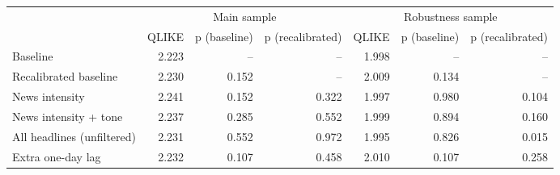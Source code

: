 \begin{tabular}{lrrrrrr}
\toprule
 & \multicolumn{3}{c}{Main sample} & \multicolumn{3}{c}{Robustness sample} \\
 & QLIKE & p (baseline) & p (recalibrated) & QLIKE & p (baseline) & p (recalibrated) \\
\midrule
Baseline & 2.223 & -- & -- & 1.998 & -- & -- \\
Recalibrated baseline & 2.230 & 0.152 & -- & 2.009 & 0.134 & -- \\
News intensity & 2.241 & 0.152 & 0.322 & 1.997 & 0.980 & 0.104 \\
News intensity + tone & 2.237 & 0.285 & 0.552 & 1.999 & 0.894 & 0.160 \\
All headlines (unfiltered) & 2.231 & 0.552 & 0.972 & 1.995 & 0.826 & 0.015 \\
Extra one-day lag & 2.232 & 0.107 & 0.458 & 2.010 & 0.107 & 0.258 \\
\bottomrule
\end{tabular}
